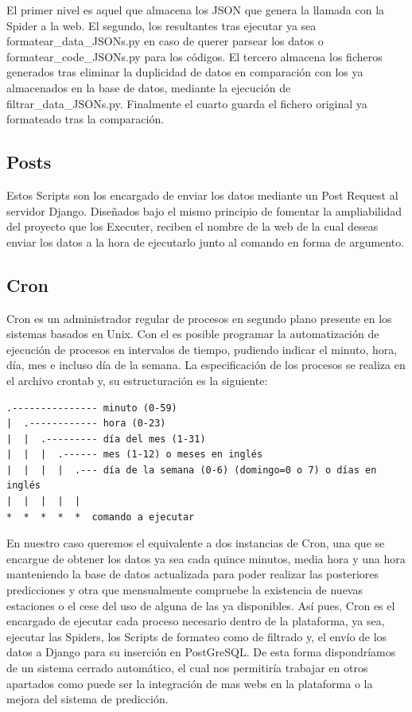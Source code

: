 El primer nivel es aquel que almacena los JSON que genera la llamada con la Spider a la web. El segundo, los resultantes tras ejecutar ya sea formatear\_data\_JSONs.py en caso de querer parsear los datos o formatear\_code\_JSONs.py para los códigos. El tercero almacena los ficheros generados tras eliminar la duplicidad de datos en comparación con los ya almacenados en la base de datos, mediante la ejecución de filtrar\_data\_JSONs.py. Finalmente el cuarto guarda el fichero original ya formateado tras la comparación.

\subsection{Posts}
Estos Scripts son los encargado de enviar los datos mediante un Post Request al servidor Django.\newline
\newline
Diseñados bajo el mismo principio de fomentar la ampliabilidad del proyecto que los Executer, reciben el nombre de la web de la cual deseas enviar los datos a la hora de ejecutarlo junto al comando en forma de argumento.

\subsection{Cron}
Cron es un administrador regular de procesos en segundo plano presente en los sistemas basados en Unix. Con el es posible programar la automatización de ejecución de procesos en intervalos de tiempo, pudiendo indicar el minuto, hora, día, mes e incluso día de la semana.\newline
\newline
La especificación de los procesos se realiza en el archivo crontab y, su estructuración es la siguiente:

\begin{verbatim}
.--------------- minuto (0-59) 
|  .------------ hora (0-23)
|  |  .--------- día del mes (1-31)
|  |  |  .------ mes (1-12) o meses en inglés
|  |  |  |  .--- día de la semana (0-6) (domingo=0 o 7) o días en inglés 
|  |  |  |  |
*  *  *  *  *  comando a ejecutar
\end{verbatim}

En nuestro caso queremos el equivalente a dos instancias de Cron, una que se encargue de obtener los datos ya sea cada quince minutos, media hora y una hora manteniendo la base de datos actualizada para poder realizar las posteriores predicciones y otra que mensualmente compruebe la existencia de nuevas estaciones o el cese del uso de alguna de las ya disponibles.\newline
\newline
Así pues, Cron es el encargado de ejecutar cada proceso necesario dentro de la plataforma, ya sea, ejecutar las Spiders, los Scripts de formateo como de filtrado y, el envío de los datos a Django para su inserción en PostGreSQL.\newline
\newline
De esta forma dispondríamos de un sistema cerrado automático, el cual nos permitiría trabajar en otros apartados como puede ser la integración de mas webs en la plataforma o la mejora del sistema de predicción.

